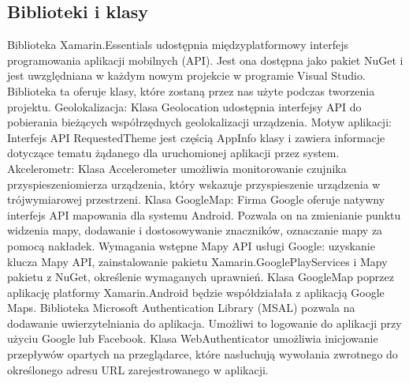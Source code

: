 \subsection{Biblioteki i klasy}
\hspace{1cm} Biblioteka Xamarin.Essentials udostępnia międzyplatformowy interfejs programowania aplikacji mobilnych (API). Jest ona dostępna jako pakiet NuGet i jest uwzględniana w każdym nowym projekcie w programie Visual Studio.
Biblioteka ta oferuje klasy, które zostaną przez nas użyte podczas tworzenia projektu.
\newline
Geolokalizacja:
\newline
Klasa Geolocation udostępnia interfejsy API do pobierania bieżących współrzędnych geolokalizacji urządzenia.
\newline
Motyw aplikacji:
\newline
Interfejs API RequestedTheme jest częścią AppInfo klasy i zawiera informacje dotyczące tematu żądanego dla uruchomionej aplikacji przez system.
\newline
Akcelerometr:
\newline
Klasa Accelerometer umożliwia monitorowanie czujnika przyspieszeniomierza urządzenia, który wskazuje przyspieszenie urządzenia w trójwymiarowej przestrzeni.
\newline
Klasa GoogleMap:
\newline
Firma Google oferuje natywny interfejs API mapowania dla systemu Android. Pozwala on na zmienianie punktu widzenia mapy, dodawanie i dostosowywanie znaczników, oznaczanie mapy za pomocą nakładek.
\newline
Wymagania wstępne Mapy API usługi Google: uzyskanie klucza Mapy API, zainstalowanie pakietu Xamarin.GooglePlayServices i Mapy pakietu z NuGet, określenie wymaganych uprawnień.
\newline
Klasa GoogleMap poprzez aplikację platformy Xamarin.Android będzie współdziałała z aplikacją Google Maps.
\newline
\newline
Biblioteka Microsoft Authentication Library (MSAL) pozwala na dodawanie uwierzytelniania do aplikacja. Umożliwi to logowanie do aplikacji przy użyciu Google lub Facebook.
\newline
Klasa WebAuthenticator umożliwia inicjowanie przepływów opartych na przeglądarce, które nasłuchują wywołania zwrotnego do określonego adresu URL zarejestrowanego w aplikacji.
\newline



 
 
